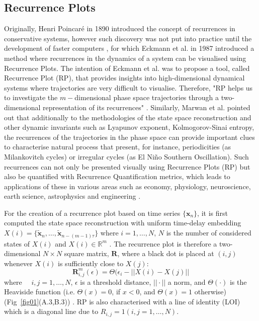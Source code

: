 \documentclass[fleqn,10pt]{wlscirep}
\begin{document}
\subsection*{Recurrence Plots}
Originally, Henri Poincar\'e in 1890 introduced the concept of recurrences 
in conservative systems, however such discovery was not put into practice 
until the development of faster computers \cite{marwan2007},
for which Eckmann et al. \cite{eckmann1987} in 1987 introduced a method
where recurrences in the dynamics of a system can be visualised using 
Recurrence Plots. The intention of Eckmann et al. \cite{eckmann1987} was to 
propose a tool, called Recurrence Plot (RP), that provides insights into 
high-dimensional dynamical systems where trajectories are very difficult to 
visualise. Therefore, "RP helps us to investigate the 
$m-$dimensional phase space trajectories through a two-dimensional 
representation of its recurrences" \cite{marwan2015}.
Similarly, Marwan et al. \cite{marwan2015} pointed out that additionally 
to the methodologies of the state space reconstruction and other dynamic 
invariants such as Lyapunov exponent, Kolmogorov-Sinai entropy, 
the recurrences of the trajectories in the phase space can provide 
important clues to characterise natural process that present, for
instance, periodicities (as Milankovitch cycles) or irregular cycles 
(as El Ni\~no Southern Oscillation). 
Such recurrences can not only be presented visually using Recurrence Plots (RP) 
but also be quantified with Recurrence Quantification metrics, which leads 
to applications of these in various areas such as economy, physiology, 
neuroscience, earth science, astrophysics and engineering \cite{marwan2007}.

For the creation of a recurrence plot based on time series 
$\{ \boldsymbol{x}_n \}$, it is first computed the state space 
reconstruction with uniform time-delay embedding 
$X(i)=\{ \boldsymbol{ \tilde{x} }_n, \dots,  
\boldsymbol{ \tilde{x} }_{n -(m-1)\tau} \}$
where $i=1,\dots,N$, $N$ is the number of considered states of $X(i)$ 
and $X(i) \in \mathbb{R}^m$ \cite{eckmann1987}.
The recurrence plot is therefore a two-dimensional $N \times N$ square 
matrix, $\mathbf{R}$, where a black dot is placed at $(i,j)$ 
whenever $X(i)$ is sufficiently close to $X(j)$: 
\begin{equation}
\mathbf{R}^{m}_{i,j} (\epsilon) = \Theta ( \epsilon_i - || X(i) - X(j) ||
\end{equation}
where $\quad i,j=1,\dots,N$, $\epsilon$ is a threshold distance, 
$|| \cdotp ||$ a norm, and $\Theta(\cdotp)$ is the Heaviside 
function (i.e. $\Theta(x)=0$, if $x<0$, and $\Theta(x)=1$ otherwise) 
(Fig~\ref{fig01}(A.3,B.3)) \cite{eckmann1987, marwan2007,marwan2015}.
RP is also characterised with a line of identity (LOI) which is a  
diagonal line due to $ R_{i,j}=1 (i,j=1,\dots,N)$. 
\end{document}
